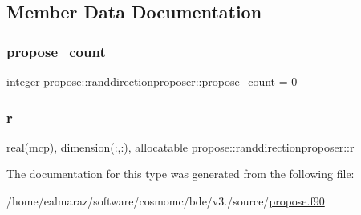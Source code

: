 \subsection{Member Data Documentation}
\mbox{\label{structpropose_1_1randdirectionproposer_a9d4cd38e5a89ce4a7ebf006053e09c82}} 
\subsubsection{\texorpdfstring{propose\+\_\+count}{propose\_count}}
{\footnotesize\ttfamily integer propose\+::randdirectionproposer\+::propose\+\_\+count = 0}

\mbox{\label{structpropose_1_1randdirectionproposer_a14eb3500d0941ef4dd938f149b404fe0}} 
\subsubsection{\texorpdfstring{r}{r}}
{\footnotesize\ttfamily real(mcp), dimension(\+:,\+:), allocatable propose\+::randdirectionproposer\+::r}



The documentation for this type was generated from the following file\+:\begin{DoxyCompactItemize}
\item 
/home/ealmaraz/software/cosmomc/bde/v3./source/\mbox{\hyperlink{propose_8f90}{propose.\+f90}}\end{DoxyCompactItemize}
